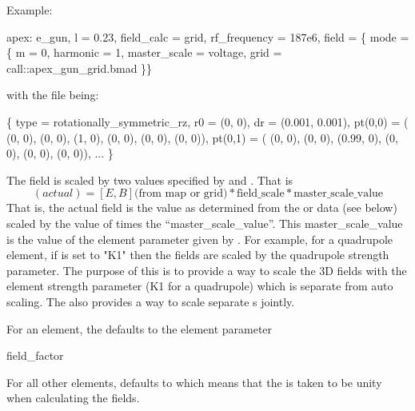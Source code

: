 Example:
\begin{example}
  apex: e_gun, l = 0.23, field_calc = grid, rf_frequency = 187e6, 
    field = \{ mode = \{
      m = 0, harmonic = 1,
      master_scale = voltage,
      grid = call::apex_gun_grid.bmad \}\}
\end{example}
with the file  being:
\begin{example}
  \{
    type = rotationally_symmetric_rz,
    r0 = (0, 0),
    dr = (0.001, 0.001),
    pt(0,0) = ( (0, 0), (0, 0), (1, 0),  (0, 0), (0, 0), (0, 0)),
    pt(0,1) = ( (0, 0), (0, 0), (0.99, 0),  (0, 0), (0, 0), (0, 0)),
    ... \}
\end{example}

The field is scaled by two values specified by  and
. That is
\begin{equation}
  [E, B] (actual) = [E, B] \mbox{(from map or grid)} * 
  \mbox{field_scale} * \mbox{master_scale_value}
\end{equation}
That is, the actual field is the value as determined from the 
or  data (see below) scaled by the value of 
times the ``master_scale_value''. This master_scale_value is the value
of the element parameter given by . For example, for
a quadrupole element, if  is set to "K1" then the
fields are scaled by the quadrupole strength parameter. The purpose of
this  is to provide a way to scale the 3D fields with
the element strength parameter (K1 for a quadrupole) which is separate
from auto scaling. The  also provides a way to scale
separate s jointly.

For an  element, the  defaults to the
element parameter
\begin{example}
  field_factor
\end{example}
For all other elements,  defaults to  which
means that the  is taken to be unity when
calculating the fields.

